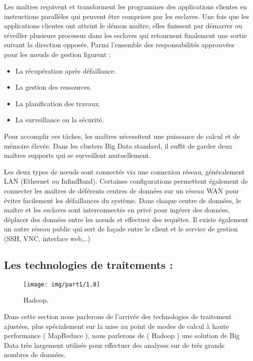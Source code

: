 Les maîtres reçoivent et transforment les programmes des applications clientes en instructions parallèles qui peuvent être comprises par les esclaves. Une fois que les applications clientes ont atteint le démon maître, elles finissent par démarrer ou réveiller plusieurs processus dans les esclaves qui retournent finalement une sortie suivant la direction opposée. Parmi l'ensemble des responsabilités approuvées pour les nœuds de gestion figurent :

\begin{itemize}[label=\textbullet]
	\item La récupération après défaillance.
	\item La gestion des ressources.
	\item La planification des travaux.
	\item La surveillance ou la sécurité.
\end{itemize}

Pour accomplir ces tâches, les maîtres nécessitent une puissance de calcul et de mémoire élevée. Dans les clusters Big Data standard, il suffit de garder deux maîtres supports qui se surveillent mutuellement.

Les deux types de nœuds sont connectés via une connexion réseau, généralement LAN (Ethernet ou InfiniBand). Certaines configurations permettent également de connecter les maîtres de déférents centres de données sur un réseau WAN pour éviter facilement les défaillances du système. Dans chaque centre de données, le maître et les esclaves sont interconnectés en privé pour ingérer des données, déplacer des données entre les nœuds et effectuer des requêtes. Il existe également un autre réseau public qui sert de façade entre le client et le service de gestion (SSH, VNC, interface web,..)

\subsection{Les technologies de traitements :}

\begin{figure}[h]
	\centering
	\texttt{[image: img/part1/1.8]}
	\caption{Hadoop.}
\end{figure}

Dans cette section nous parlerons de l'arrivée des technologies de traitement ajustées, plus spécialement sur la mise au point de modes de calcul à haute performance ( MapReduce ), nous parlerons de ( Hadoop ) une solution de Big Data très largement utilisée pour effectuer des analyses sur de très grands nombres de données.

